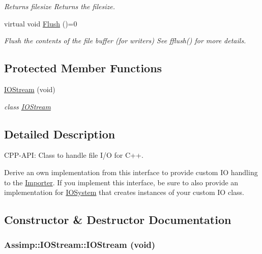 \begin{CompactItemize}
\begin{CompactList}\small\item\em Returns filesize Returns the filesize. \item\end{CompactList}\item 
\hypertarget{class_assimp_1_1_i_o_stream_7c19952446ece90924b246f087417899}{
virtual void \hyperlink{class_assimp_1_1_i_o_stream_7c19952446ece90924b246f087417899}{Flush} ()=0}
\label{class_assimp_1_1_i_o_stream_7c19952446ece90924b246f087417899}

\begin{CompactList}\small\item\em Flush the contents of the file buffer (for writers) See fflush() for more details. \item\end{CompactList}\end{CompactItemize}
\subsection*{Protected Member Functions}
\begin{CompactItemize}
\item 
\hyperlink{class_assimp_1_1_i_o_stream_f5ae78123b6c6f7afc31b2a52dc9192e}{IOStream} (void)
\begin{CompactList}\small\item\em class \hyperlink{class_assimp_1_1_i_o_stream}{IOStream} \item\end{CompactList}\end{CompactItemize}


\subsection{Detailed Description}
CPP-API: Class to handle file I/O for C++. 

Derive an own implementation from this interface to provide custom IO handling to the \hyperlink{class_assimp_1_1_importer}{Importer}. If you implement this interface, be sure to also provide an implementation for \hyperlink{class_assimp_1_1_i_o_system}{IOSystem} that creates instances of your custom IO class. 

\subsection{Constructor \& Destructor Documentation}
\hypertarget{class_assimp_1_1_i_o_stream_f5ae78123b6c6f7afc31b2a52dc9192e}{
\subsubsection[IOStream]{\setlength{\rightskip}{0pt plus 5cm}Assimp::IOStream::IOStream (void)}}
\label{class_assimp_1_1_i_o_stream_f5ae78123b6c6f7afc31b2a52dc9192e}


